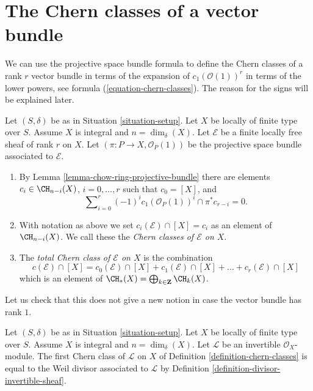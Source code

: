 \section{The Chern classes of a vector bundle}
\label{section-chern-classes-vector-bundles}

\noindent
We can use the projective space bundle formula to define the
Chern classes of a rank $r$ vector bundle in terms of the expansion
of $c_1(\mathcal{O}(1))^r$ in terms of the lower powers, see
formula (\ref{equation-chern-classes}).
The reason for the signs will be explained later.

\begin{definition}
\label{definition-chern-classes}
Let $(S, \delta)$ be as in Situation \ref{situation-setup}.
Let $X$ be locally of finite type over $S$.
Assume $X$ is integral and $n = \dim_\delta(X)$.
Let $\mathcal{E}$ be a finite locally free sheaf of rank $r$
on $X$. Let $(\pi : P \to X, \mathcal{O}_P(1))$ be the projective space
bundle associated to $\mathcal{E}$.
\begin{enumerate}
\item By Lemma \ref{lemma-chow-ring-projective-bundle} there are
elements $c_i \in \CH_{n - i}(X)$, $i = 0, \ldots, r$
such that $c_0 = [X]$, and
\begin{equation}
\label{equation-chern-classes}
\sum\nolimits_{i = 0}^r
(-1)^i c_1(\mathcal{O}_P(1))^i \cap \pi^*c_{r - i}
= 0.
\end{equation}
\item With notation as above we set
$c_i(\mathcal{E}) \cap [X] = c_i$
as an element of $\CH_{n - i}(X)$.
We call these the {\it Chern classes of $\mathcal{E}$ on $X$}.
\item The {\it total Chern class of $\mathcal{E}$ on $X$}
is the combination
$$
c({\mathcal E}) \cap [X] =
c_0({\mathcal E}) \cap [X]
+ c_1({\mathcal E}) \cap [X] + \ldots
+ c_r({\mathcal E}) \cap [X]
$$
which is an element of
$\CH_*(X) = \bigoplus_{k \in \mathbf{Z}} \CH_k(X)$.
\end{enumerate}
\end{definition}

\noindent
Let us check that this does not give a new notion in case the
vector bundle has rank $1$.

\begin{lemma}
\label{lemma-first-chern-class}
Let $(S, \delta)$ be as in Situation \ref{situation-setup}.
Let $X$ be locally of finite type over $S$.
Assume $X$ is integral and $n = \dim_\delta(X)$.
Let $\mathcal{L}$ be an invertible $\mathcal{O}_X$-module.
The first Chern class of $\mathcal{L}$ on $X$ of
Definition \ref{definition-chern-classes}
is equal to the Weil divisor associated to $\mathcal{L}$
by Definition \ref{definition-divisor-invertible-sheaf}.
\end{lemma}

